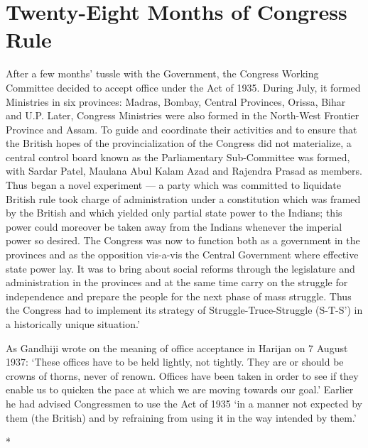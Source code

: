 
\chapter{Twenty-Eight Months of Congress Rule}

After a few months' tussle with the Government, the Congress Working Committee decided to accept office under the Act of 1935. During July, it formed Ministries in six provinces: Madras, Bombay, Central Provinces, Orissa, Bihar and U.P. Later, Congress Ministries were also formed in the North-West Frontier Province and Assam. To guide and coordinate their activities and to ensure that the British hopes of the provincialization of the Congress did not materialize, a central control board known as the Parliamentary Sub-Committee was formed, with Sardar Patel, Maulana Abul Kalam Azad and Rajendra Prasad as members. Thus began a novel experiment --- a party which was committed to liquidate British rule took charge of administration under a constitution which was framed by the British and which yielded only partial state power to the Indians; this power could moreover be taken away from the Indians whenever the imperial power so desired. The Congress was now to function both as a government in the provinces and as the opposition vis-a-vis the Central Government where effective state power lay. It was to bring about social reforms through the legislature and administration in the provinces and at the same time carry on the struggle for independence and prepare the people for the next phase of mass struggle. Thus the Congress had to implement its strategy of Struggle-Truce-Struggle (S-T-S') in a historically unique situation.' 

As Gandhiji wrote on the meaning of office acceptance in Harijan on 7 August 1937: `These offices have to be held lightly, not tightly. They are or should be crowns of thorns, never of renown. Offices have been taken in order to see if they enable us to quicken the pace at which we are moving towards our goal.' Earlier he had advised Congressmen to use the Act of 1935 `in a manner not expected by them (the British) and by refraining from using it in the way intended by them.'

\begin{center}*\end{center}

\paragraph*{}

